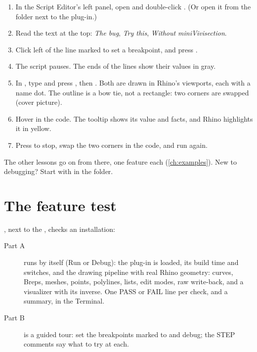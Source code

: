 \begin{enumerate}[label=\arabic*.]
  \item In the Script Editor's left panel, open  and double-click
        . (Or open it from the  folder next to the plug-in.)
  \item Read the text at the top: \emph{The bug}, \emph{Try this}, \emph{Without miniVivisection}.
  \item Click left of the line marked  to set a breakpoint, and press .
  \item The script pauses. The ends of the lines show their values in gray.
  \item In , type  and press , then . Both are drawn in
        Rhino's viewports, each with a name dot. The outline is a bow tie, not a rectangle: two corners
        are swapped (cover picture).
  \item Hover  in the code. The tooltip shows its value and facts, and Rhino highlights it
        in yellow.
  \item Press  to stop, swap the two corners in the code, and run again.
\end{enumerate}

The other lessons go on from there, one feature each (\cref{ch:examples}). New to debugging? Start with
 in the  folder.

\section{The feature test}\label{sec:featuretest}

, next to the , checks an installation:

\begin{description}
  \item[Part A] runs by itself (Run or Debug): the plug-in is loaded, its build time and switches, and
        the drawing pipeline with real Rhino geometry: curves, Breps, meshes, points, polylines, lists,
        edit modes, raw write-back, and a visualizer with its inverse. One PASS or FAIL line per check,
        and a summary, in the Terminal.
  \item[Part B] is a guided tour: set the breakpoints marked  to  and debug;
        the STEP comments say what to try at each.
\end{description}

